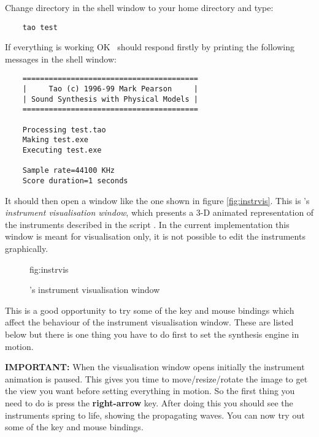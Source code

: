 Change directory in the shell window to your home directory and type:
\begin{verbatim}
    tao test
\end{verbatim}

If everything is working OK \tao\ should respond firstly by printing
the following messages in the shell window:

\begin{verbatim}
    ========================================
    |     Tao (c) 1996-99 Mark Pearson     |
    | Sound Synthesis with Physical Models |
    ========================================

    Processing test.tao
    Making test.exe
    Executing test.exe

    Sample rate=44100 KHz
    Score duration=1 seconds                
\end{verbatim}

It should then open a window like the one shown in figure \ref{fig:instrvis}.
This is \tao's \emph{instrument visualisation window},
which presents a 3-D animated representation of the instruments
described in the script . In the current implementation this
window is meant for visualisation only, it is not possible to edit the
instruments graphically.

\begin{figure}[htb]
  \begin{Label}{fig:instrvis}
    \begin{center}
    \end{center}
    \caption{\tao's instrument visualisation window}
  \end{Label}
\end{figure}

This is a good opportunity to try some of the key and mouse bindings which
affect the behaviour of the instrument visualisation window. These are
listed below but there is one thing you have to do first to set the synthesis
engine in motion.

\textbf{IMPORTANT:} When the visualisation window opens initially the
instrument animation is paused. This gives you time to move/resize/rotate
the image to get the view you want before setting everything in motion.
So the first thing you need to do is press the \textbf{right-arrow} key.
After doing this you should see the instruments spring to life, showing
the propagating waves. You can now try out some of the key and mouse bindings.

